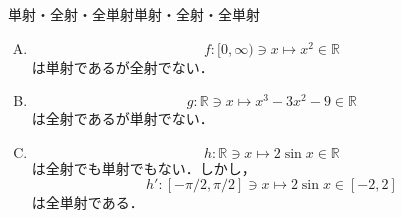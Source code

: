 \begin{example}{単射・全射・全単射}{単射・全射・全単射}
  \begin{enumerate}[(A)]
    \item
          \[
            f \colon [0,\infty) \ni x \mapsto x^2  \in \mathbb{R}
          \]
          は単射であるが全射でない．
    \item
          \[
            g \colon \mathbb{R} \ni x \mapsto x^3 -3x^2 -9 \in \mathbb{R}
          \]
          は全射であるが単射でない．
    \item
          \[
            h  \colon \mathbb{R} \ni x \mapsto  2 \sin x \in  \mathbb{R}
          \]
          は全射でも単射でもない．しかし，
          \[
            h'  \colon [-\pi/2 , \pi/2 ]  \ni x \mapsto  2 \sin  x  \in [-2,2]
          \]
          は全単射である．
  \end{enumerate}
  \end{example}